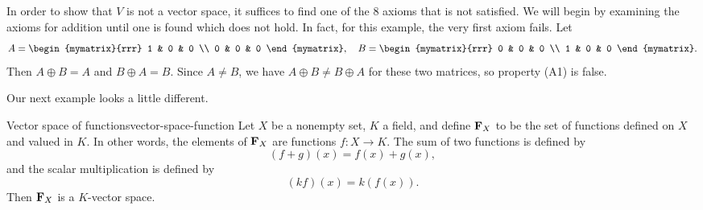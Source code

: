 \begin{solution}
  In order to show that $V$ is not a vector space, it suffices to find
  one of the 8 axioms that is not satisfied. We will begin by examining
  the axioms for addition until one is found which does not hold. In
  fact, for this example, the very first axiom fails. Let
  \begin{equation*}
    A = \begin{mymatrix}{rrr}
      1 & 0 & 0 \\
      0 & 0 & 0
    \end{mymatrix},
    \quad
    B = \begin{mymatrix}{rrr}
      0 & 0 & 0 \\
      1 & 0 & 0
    \end{mymatrix}.
  \end{equation*}
  Then $A\oplus B=A$ and $B\oplus A=B$. Since $A\neq B$, we have
  $A\oplus B\neq B\oplus A$ for these two matrices, so property (A1)
  is false. 
\end{solution}

Our next example looks a little different. 

\begin{example}{Vector space of functions}{vector-space-function}
  Let $X$ be a nonempty set, $K$ a field, and define $\mathbf{F}_X$%
   to be the set of functions
   defined on $X$ and valued in
  $K$. In other words, the elements of $\mathbf{F}_X$ are functions
  $f:X\to K$. The sum of two functions is defined by
  \begin{equation*}
    (f + g)(x) = f(x) + g(x),
  \end{equation*}
  and the scalar multiplication is defined by
  \begin{equation*}
    (kf) (x) = k(f(x)).
  \end{equation*}
  Then $\mathbf{F}_X$ is a $K$-vector space.
\end{example}

